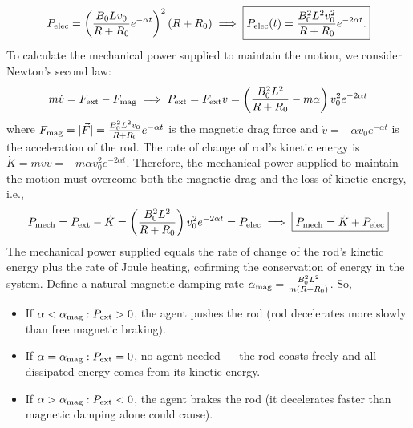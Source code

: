 \documentclass[a4paper,12pt]{article}
\begin{document}
\[
P_{\rm elec}
=
\left(
\frac{B_0Lv_0}{R+R_0}
e^{-\alpha t}
\right)^2
(R+R_0) \implies \boxed{
P_{\rm elec}(t)
=
\frac{B_0^2L^2v_0^2}{R+R_0}
e^{-2\alpha t}.
}
\]
To calculate the mechanical power supplied to maintain the motion, we consider Newton's second law:
\[
m\dot{v} = F_{\rm ext} - F_{\rm mag} \implies P_{\rm ext} = F_{\rm ext}v =  \left(\frac{B_0^2L^2}{R+R_0}-m\alpha \right) v_0^2 e^{-2\alpha t} 
\]
where $F_{\rm mag} = |\vec F| = \frac{B_0^2L^2v_0}{R+R_0} e^{-\alpha t}$ is the magnetic drag force and $\dot{v} = -\alpha v_0 e^{-\alpha t}$ is the acceleration of the rod. The rate of change of rod's kinetic energy is $\dot{K} = m v \dot{v} = -m\alpha v_0^2 e^{-2\alpha t}$. Therefore, the mechanical power supplied to maintain the motion must overcome both the magnetic drag and the loss of kinetic energy, i.e.,
\[P_{\rm mech} = P_{\rm ext} - \dot{K} = \left(\frac{B_0^2L^2}{R+R_0}\right) v_0^2 e^{-2\alpha t} = P_{\rm elec} \implies \boxed{
P_{\rm mech}
=
\dot{K}+P_{\rm elec}
}
\]
The mechanical power supplied equals the rate of change of the rod's kinetic energy plus the rate of Joule heating, cofirming the conservation of energy in the system. Define a natural magnetic-damping rate $\alpha_{\rm mag} = \frac{B_0^2L^2}{m(R+R_0)}$. So,
\begin{itemize}
\item If $\alpha < \alpha_{\rm mag}: P_{\rm ext} > 0$, the agent pushes the rod (rod decelerates more slowly than free magnetic braking).
\item If $\alpha = \alpha_{\rm mag}: P_{\rm ext} = 0$,  no agent needed — the rod coasts freely and all dissipated energy comes from its kinetic energy.
\item If $\alpha > \alpha_{\rm mag}: P_{\rm ext} < 0$, the agent brakes the rod (it decelerates faster than magnetic damping alone could cause).
\end{itemize} 
\end{document}
